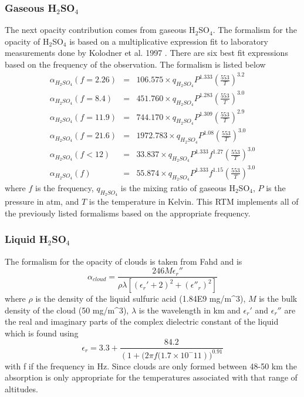 \subsubsection{Gaseous H$_2$SO$_4$}
The next opacity contribution comes from gaseous H$_2$SO$_4$. The formalism for the opacity of H$_2$SO$_4$ is based on a multiplicative expression fit to laboratory measurements done by Kolodner et al. 1997 \cite{Kolodner-thesis}. There are six best fit expressions based on the frequency of the observation. The formalism is listed below
\begin{eqnarray}
\alpha_{H_2SO_4}(f = 2.26) &=& 106.575 \times q_{H_2SO_4}P^{1.333}\left(\frac{553}{T}\right)^{3.2} \\
\alpha_{H_2SO_4}(f = 8.4)  &=& 451.760 \times q_{H_2SO_4}P^{1.283}\left(\frac{553}{T}\right)^{3.0} \\
\alpha_{H_2SO_4}(f = 11.9) &=& 744.170 \times q_{H_2SO_4}P^{1.309}\left(\frac{553}{T}\right)^{2.9} \\
\alpha_{H_2SO_4}(f = 21.6) &=& 1972.783 \times q_{H_2SO_4}P^{1.08}\left(\frac{553}{T}\right)^{3.0} \\
\alpha_{H_2SO_4}(f < 12)   &=& 33.837 \times q_{H_2SO_4}P^{1.333}f^{1.27}\left(\frac{553}{T}\right)^{3.0} \\
\alpha_{H_2SO_4}(f)        &=& 55.874 \times q_{H_2SO_4}P^{1.333}f^{1.15}\left(\frac{553}{T}\right)^{3.0} 
\end{eqnarray}
where $f$ is the frequency, $q_{H_2SO_4}$ is the mixing ratio of gaseous H$_2$SO$_4$, $P$ is the pressure in atm, and $T$ is the temperature in Kelvin. This RTM implements all of the previously listed formalisms based on the appropriate frequency.

\subsubsection{Liquid H$_2$SO$_4$}
The formalism for the opacity of clouds is taken from Fahd \cite{Fahd-thesis} and is
\begin{equation}
\alpha_{cloud} = \frac{246 M \epsilon_r''}{\rho \lambda \left[ (\epsilon_r' +2)^2 + (\epsilon''_r)^2\right]}
\end{equation}
where $\rho$ is the density of the liquid sulfuric acid (1.84E9 mg/m\^{}3), $M$ is the bulk density of the cloud (50 mg/m\^{}3), $\lambda$ is the wavelength in km and $\epsilon_r'$ and $\epsilon_r''$ are the real and imaginary parts of the complex dielectric constant of the liquid which is found using
\begin{equation}
\epsilon_r = 3.3+\frac{84.2}{\left(1+(2\pi f (1.7\times 10^-11\right))^{0.91}}
\end{equation} 
with f if the frequency in Hz. 
Since clouds are only formed between 48-50 km the absorption is only appropriate for the temperatures associated with that range of altitudes. 

